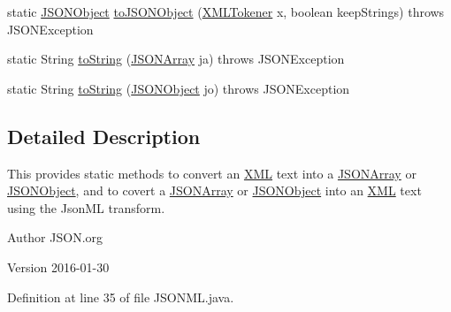 \begin{DoxyCompactItemize}
\item 
static \hyperlink{classorg_1_1json_1_1JSONObject}{J\-S\-O\-N\-Object} \hyperlink{classorg_1_1json_1_1JSONML_a79a799675cf7c900eea8596efef305e3}{to\-J\-S\-O\-N\-Object} (\hyperlink{classorg_1_1json_1_1XMLTokener}{X\-M\-L\-Tokener} x, boolean keep\-Strings)  throws J\-S\-O\-N\-Exception 
\item 
static String \hyperlink{classorg_1_1json_1_1JSONML_aeb4921c45210936fbcd3a527e1df88fd}{to\-String} (\hyperlink{classorg_1_1json_1_1JSONArray}{J\-S\-O\-N\-Array} ja)  throws J\-S\-O\-N\-Exception 
\item 
static String \hyperlink{classorg_1_1json_1_1JSONML_aa436f0b8577f68314e12f23f803437c2}{to\-String} (\hyperlink{classorg_1_1json_1_1JSONObject}{J\-S\-O\-N\-Object} jo)  throws J\-S\-O\-N\-Exception 
\end{DoxyCompactItemize}


\subsection{Detailed Description}
This provides static methods to convert an \hyperlink{classorg_1_1json_1_1XML}{X\-M\-L} text into a \hyperlink{classorg_1_1json_1_1JSONArray}{J\-S\-O\-N\-Array} or \hyperlink{classorg_1_1json_1_1JSONObject}{J\-S\-O\-N\-Object}, and to covert a \hyperlink{classorg_1_1json_1_1JSONArray}{J\-S\-O\-N\-Array} or \hyperlink{classorg_1_1json_1_1JSONObject}{J\-S\-O\-N\-Object} into an \hyperlink{classorg_1_1json_1_1XML}{X\-M\-L} text using the Json\-M\-L transform.

\begin{DoxyAuthor}{Author}
J\-S\-O\-N.\-org 
\end{DoxyAuthor}
\begin{DoxyVersion}{Version}
2016-\/01-\/30 
\end{DoxyVersion}


Definition at line 35 of file J\-S\-O\-N\-M\-L.\-java.



